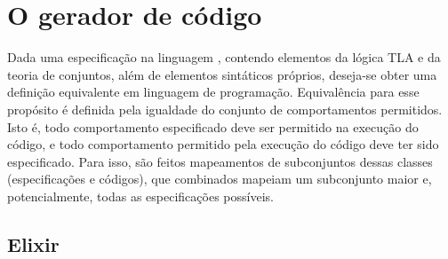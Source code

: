 \chapter{O gerador de código}
\label{cap3}

Dada uma especificação na linguagem \TLAA, contendo elementos da lógica TLA e da
teoria de conjuntos, além de elementos sintáticos próprios, deseja-se obter uma
definição equivalente em linguagem de programação. Equivalência para esse
propósito é definida pela igualdade do conjunto de comportamentos permitidos.
Isto é, todo comportamento especificado deve ser permitido na execução do
código, e todo comportamento permitido pela execução do código deve ter sido
especificado. Para isso, são feitos mapeamentos de subconjuntos dessas classes
(especificações e códigos),
que combinados mapeiam um subconjunto maior e, potencialmente, todas as
especificações possíveis. 

\section{Elixir}
\label{elixir}


